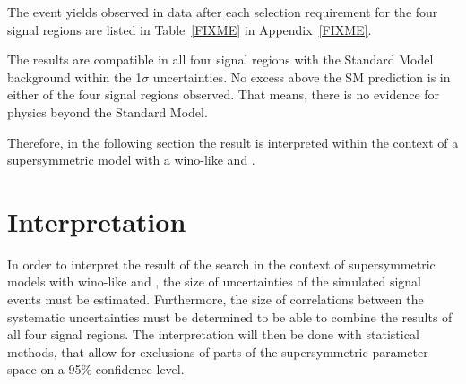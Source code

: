 \renewcommand{\arraystretch}{1.5}
\begin{table}[!h]
\centering
\caption{Number of predicted and observed events for the four different signal regions.}
\label{tab:FinalResult}
\end{table}
The event yields observed in data after each selection requirement for the four signal regions are listed in Table~\ref{FIXME} in Appendix~\ref{FIXME}.

The results are compatible in all four signal regions with the Standard Model background within the 1$\sigma$ uncertainties.
No excess above the SM prediction is in either of the four signal regions observed.
That means, there is no evidence for physics beyond the Standard Model.

Therefore, in the following section the result is interpreted within the context of a supersymmetric model with a wino-like \chipm and \chiO.

\chapter{Interpretation}
\label{sec:Interpretation}
In order to interpret the result of the search in the context of supersymmetric models with wino-like \chipm and \chiO, the size of uncertainties of the simulated signal events must be estimated.
Furthermore, the size of correlations between the systematic uncertainties must be determined to be able to combine the results of all four signal regions.
The interpretation will then be done with statistical methods, that allow for exclusions of parts of the supersymmetric parameter space on a 95\% confidence level.

